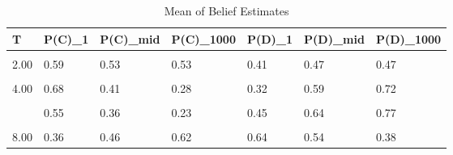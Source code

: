 \begin{table}[!h]
\centering
\caption{Mean of Belief Estimates}
\centering
\begin{tabular}[t]{lllllll}
\toprule
T & P(C)\_1 & P(C)\_mid & P(C)\_1000 & P(D)\_1 & P(D)\_mid & P(D)\_1000\\
\midrule
\cellcolor{gray!10}{1.00} & \cellcolor{gray!10}{0.69} & \cellcolor{gray!10}{0.36} & \cellcolor{gray!10}{0.35} & \cellcolor{gray!10}{0.31} & \cellcolor{gray!10}{0.64} & \cellcolor{gray!10}{0.65}\\
2.00 & 0.59 & 0.53 & 0.53 & 0.41 & 0.47 & 0.47\\
\cellcolor{gray!10}{3.00} & \cellcolor{gray!10}{0.55} & \cellcolor{gray!10}{0.29} & \cellcolor{gray!10}{0.27} & \cellcolor{gray!10}{0.45} & \cellcolor{gray!10}{0.71} & \cellcolor{gray!10}{0.73}\\
4.00 & 0.68 & 0.41 & 0.28 & 0.32 & 0.59 & 0.72\\
\cellcolor{gray!10}{5.00} & \cellcolor{gray!10}{0.60} & \cellcolor{gray!10}{0.38} & \cellcolor{gray!10}{0.18} & \cellcolor{gray!10}{0.40} & \cellcolor{gray!10}{0.62} & \cellcolor{gray!10}{0.82}\\
\addlinespace
6.00 & 0.55 & 0.36 & 0.23 & 0.45 & 0.64 & 0.77\\
\cellcolor{gray!10}{7.00} & \cellcolor{gray!10}{0.41} & \cellcolor{gray!10}{0.42} & \cellcolor{gray!10}{0.62} & \cellcolor{gray!10}{0.59} & \cellcolor{gray!10}{0.58} & \cellcolor{gray!10}{0.38}\\
8.00 & 0.36 & 0.46 & 0.62 & 0.64 & 0.54 & 0.38\\
\bottomrule
\end{tabular}
\end{table}
